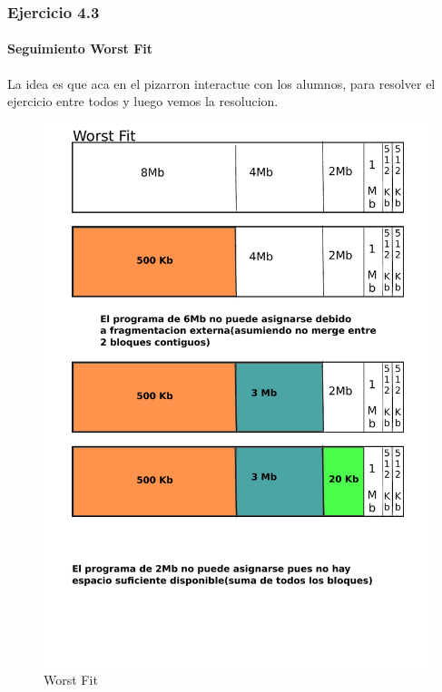 \documentclass{beamer}
\begin{document}
\begin{frame}
  \frametitle{Ejercicio 4.3}    
  \framesubtitle{Seguimiento Worst Fit}
  La idea es que aca en el pizarron interactue con los alumnos, para resolver el ejercicio entre todos y luego vemos la resolucion.
   \begin{figure}[h!]
    \centering        
      \includegraphics[scale=0.25]{worst-fit.pdf}
    \caption{Worst Fit}
  \end{figure}
\end{frame}
\end{document}
